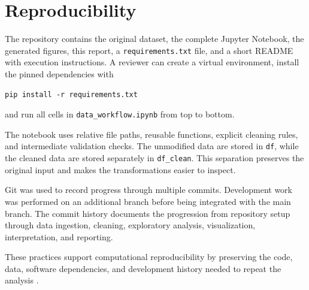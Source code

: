 \section{Reproducibility}

The repository contains the original dataset, the complete Jupyter Notebook,
the generated figures, this report, a \texttt{requirements.txt} file, and a
short README with execution instructions. A reviewer can create a virtual
environment, install the pinned dependencies with

\begin{verbatim}
pip install -r requirements.txt
\end{verbatim}

and run all cells in \texttt{data\_workflow.ipynb} from top to bottom.

The notebook uses relative file paths, reusable functions, explicit cleaning
rules, and intermediate validation checks. The unmodified data are stored in
\texttt{df}, while the cleaned data are stored separately in
\texttt{df\_clean}. This separation preserves the original input and makes the
transformations easier to inspect.

Git was used to record progress through multiple commits. Development work was
performed on an additional branch before being integrated with the main branch.
The commit history documents the progression from repository setup through
data ingestion, cleaning, exploratory analysis, visualization, interpretation,
and reporting.

These practices support computational reproducibility by preserving the code,
data, software dependencies, and development history needed to repeat the
analysis \parencite{danchev2022}.